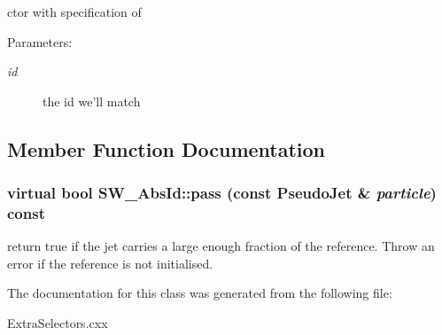 ctor with specification of \begin{Desc}
\item[Parameters:]
\begin{description}
\item[{\em id}]the id we'll match \end{description}
\end{Desc}


\subsection{Member Function Documentation}
\hypertarget{classSW__AbsId_07215949f2ea5311ce909443e5be8ee5}{
\subsubsection[pass]{\setlength{\rightskip}{0pt plus 5cm}virtual bool SW\_\-Abs\-Id::pass (const Pseudo\-Jet \& {\em particle}) const}}
\label{classSW__AbsId_07215949f2ea5311ce909443e5be8ee5}


return true if the jet carries a large enough fraction of the reference. Throw an error if the reference is not initialised. 

The documentation for this class was generated from the following file:\begin{CompactItemize}
\item 
Extra\-Selectors.cxx\end{CompactItemize}

